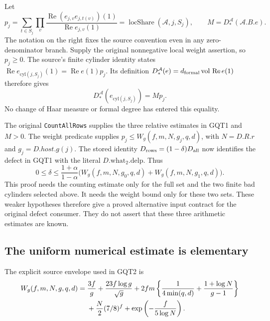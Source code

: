 Let
\[
 p_j=\sum_{t\in S_j}\prod_v
   \frac{\operatorname{Re}(e_{j,v}e_{j,t(v)})(1)}
        {\operatorname{Re}e_{j,v}(1)}
       =\operatorname{locShare}(\mathcal A,j,S_j),
 \qquad M=D_*^{\mathcal A}(\mathcal A.B.e).
\]
The notation on the right fixes the source convention even in any
zero-denominator branch. Supply the original nonnegative local
weight assertion, so $p_j\ge0$. The source's finite cylinder
identity states
$\operatorname{Re}e_{\mathrm{cyl}(j,S_j)}(1)
=\operatorname{Re}e(1)p_j$. Its definition
$D_*^{\mathcal A}(e)=d_{\rm formal}\operatorname{vol}\,
\operatorname{Re}e(1)$ therefore gives
\[
       D_*^{\mathcal A}(e_{\mathrm{cyl}(j,S_j)})=Mp_j.
\]
No change of Haar measure or formal degree has entered this equality.

The original \texttt{CountAllRows} supplies the three relative
estimates in GQT1 and $M>0$. The weight predicate supplies
$p_j\le W_g(f,m,N,g_j,q,d)$, with $N=D.R.r$ and $g_j=D.host.g(j)$.
The stored identity $D_{\rm rows}=(1-\delta)D_{\rm all}$ now
identifies the defect in GQT1 with the literal $D.\mathrm{what}_2.
\mathrm{delp}$. Thus
\begin{equation}\label{eq:gqt-source-share}
 0\le\delta\le\frac{1+\alpha}{1-\alpha}
       \bigl(W_g(f,m,N,g_0,q,d)+W_g(f,m,N,g_1,q,d)\bigr).
\end{equation}
This proof needs the counting estimate only for the full set and the
two finite bad cylinders selected above. It needs the weight bound
only for these two sets. These weaker hypotheses therefore give a
proved alternative input contract for the original defect consumer.
They do not assert that these three arithmetic estimates are known.

\subsection{The uniform numerical estimate is elementary}

The explicit source envelope used in GQT2 is
\begin{align}
 W_g(f,m,N,g,q,d)={}&\frac{3f}{g}
       +\frac{23f\log g}{\sqrt g}
       +2fm\left\{\frac1{4\min(q,d)}
                         +\frac{1+\log N}{g-1}\right\}\notag\\
       &+\frac N2(7/8)^f
         +\exp\left(-\frac f{5\log N}\right).           \label{eq:gqt-W}
\end{align}

